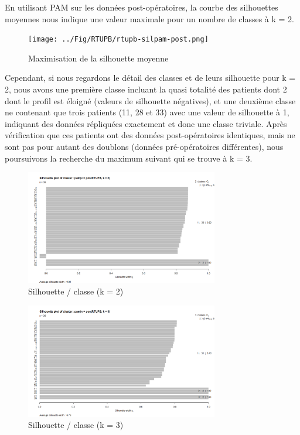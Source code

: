 %
%

En utilisant PAM sur les données post-opératoires, la courbe des silhouettes moyennes
nous indique une valeur maximale pour un nombre de classes à k = 2.

\begin{figure}[H]
\centering
\texttt{[image: ../Fig/RTUPB/rtupb-silpam-post.png]}
\caption{Maximisation de la silhouette moyenne }
\end{figure}

Cependant, si nous regardons le détail des classes et de leurs silhouette pour k = 2,
nous avons une première classe incluant la quasi totalité des patients dont 2 dont le profil est éloigné (valeurs de silhouette négatives), et une deuxième classe ne contenant que trois patients (11, 28 et 33)
avec une valeur de silhouette à 1, indiquant des données répliquées exactement et donc une classe triviale.
Après vérification que ces patients ont des données post-opératoires identiques, mais ne sont pas pour autant
des doublons (données pré-opératoires différentes), nous poursuivons la recherche du maximum suivant qui se trouve à k = 3.

\begin{figure}[H]
\centering
\includegraphics[width=0.75\textwidth]{../Fig/RTUPB/rtupb-sil-k2-post.png}
\caption{Silhouette / classe (k = 2) }
\end{figure}



\begin{figure}[H]
\centering
\includegraphics[width=0.75\textwidth]{../Fig/RTUPB/rtupb-sil-k3-post.png}
\caption{Silhouette / classe (k = 3)}
\end{figure}

